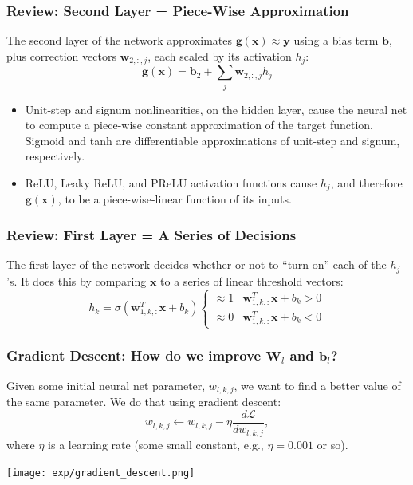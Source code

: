 \documentclass{beamer}
\begin{document}
\begin{frame}
  \frametitle{Review: Second Layer = Piece-Wise Approximation}

  The second layer of the network approximates
  $\mathbf{g}(\mathbf{x})\approx\mathbf{y}$ using a bias term
  $\mathbf{b}$, plus correction vectors $\mathbf{w}_{2,:,j}$, each
  scaled by its activation $h_j$:
  \[
  \mathbf{g}(\mathbf{x}) = \mathbf{b}_{2} + \sum_j \mathbf{w}_{2,:,j} h_j
  \]
  \begin{itemize}
  \item Unit-step and signum nonlinearities, on the hidden layer,
    cause the neural net to compute a piece-wise constant approximation
    of the target function. Sigmoid and tanh are differentiable approximations of
    unit-step and signum, respectively.
  \item ReLU, Leaky ReLU, and PReLU activation functions cause $h_j$,
    and therefore $\mathbf{g}(\mathbf{x})$, to be a piece-wise-linear function of its
    inputs.
  \end{itemize}
\end{frame}

\begin{frame}
  \frametitle{Review: First Layer = A Series of Decisions}

  The first layer of the network decides whether or not to ``turn on'' each of the
  $h_j$'s.  It does this by comparing $\mathbf{x}$ to a series of linear threshold vectors:
  \[
  h_k = \sigma\left(\mathbf{w}_{1,k,:}^T\mathbf{x}+b_k\right)\begin{cases}
  \approx 1 & \mathbf{w}_{1,k,:}^T\mathbf{x} +b_k > 0\\
  \approx 0 & \mathbf{w}_{1,k,:}^T\mathbf{x} +b_k < 0
  \end{cases}
  \]
\end{frame}

\begin{frame}
  \frametitle{Gradient Descent: How do we improve $\mathbf{W}_l$ and $\mathbf{b}_l$?}  Given
  some initial neural net parameter, $w_{l,k,j}$, we want to
  find a better value of the same parameter.  We do that using
  gradient descent:
  \[
  w_{l,k,j} \leftarrow w_{l,k,j}-\eta\frac{d{\mathcal L}}{dw_{l,k,j}},
  \]
  where $\eta$ is a learning rate (some small constant, e.g., $\eta=0.001$ or so).
  \centerline{\texttt{[image: exp/gradient\_descent.png]}}
\end{frame}
\end{document}

